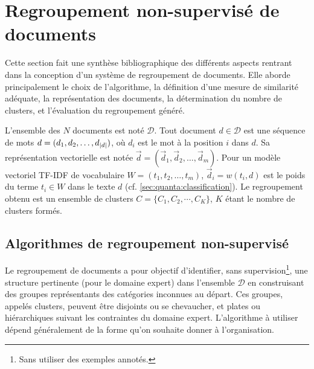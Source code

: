 
\section{Regroupement non-supervisé de documents}
\label{sec:similarite:biblio}

Cette section fait une synthèse bibliographique des différents aspects rentrant dans la conception d'un système de regroupement de documents. Elle aborde principalement le choix de l'algorithme, la définition d'une mesure de similarité adéquate, la représentation des documents, la détermination du nombre de {clusters}, et l'évaluation du regroupement généré.

L'ensemble des $N$ documents est noté $\mathcal{D}$. Tout document $d \in \mathcal{D}$ est une séquence de mots $d=(d_1, d_2, \dots, d_{{\vert d\vert}})$, où $d_i$ est le mot à la position $i$ dans $d$. Sa représentation vectorielle est notée $\vec{d}=(\vec{d}_1, \vec{d}_2, \dots, \vec{d}_m)$. Pour un modèle vectoriel TF-IDF de vocabulaire $W = (t_1, t_2, \dots, t_m)$, $\vec{d}_i = w(t_i,d)$ est le poids du terme $t_i \in W$ dans le texte $d$ ({cf. \ref{sec:quanta:classification}}). Le regroupement obtenu est un ensemble de clusters $C = \lbrace C_1, C_2, \cdots, C_K \rbrace$, $K$ étant le nombre de clusters formés.

\subsection{Algorithmes de regroupement non-supervisé}

Le regroupement de documents a pour objectif  d'identifier, sans supervision\footnote{Sans utiliser des exemples annotés.}, une structure pertinente (pour le domaine expert) dans l'ensemble $\mathcal{D}$ en construisant des groupes représentants des catégories inconnues au départ. Ces groupes, appelés clusters, peuvent être disjoints ou se chevaucher, et plates ou hiérarchiques suivant les contraintes du domaine expert. L’algorithme à utiliser dépend généralement de la forme qu’on souhaite donner à l’organisation. 

